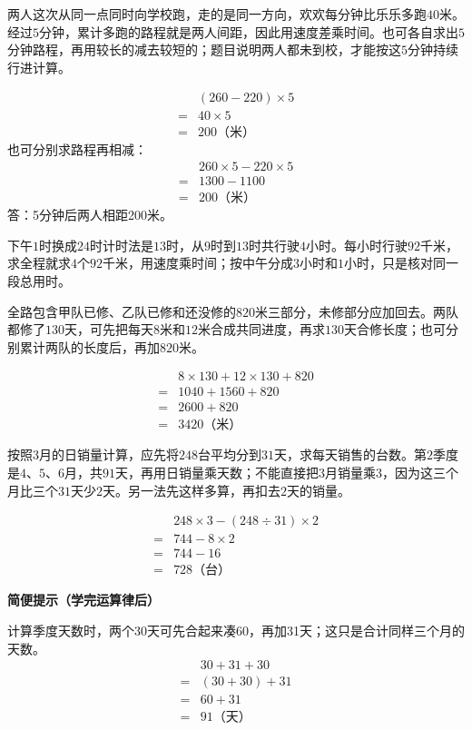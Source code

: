 \documentclass[multi=snippet,border=0pt]{standalone}
\newenvironment{snippet}[3]{\begin{minipage}{#1bp}\color{answerred}\fontsize{#2}{#3}\selectfont\raggedright}{\end{minipage}}
\begin{document}
\begin{snippet}{505}{11.5}{14}两人这次从同一点同时向学校跑，走的是同一方向，欢欢每分钟比乐乐多跑\(40\)米。经过\(5\)分钟，累计多跑的路程就是两人间距，因此用速度差乘时间。也可各自求出\(5\)分钟路程，再用较长的减去较短的；题目说明两人都未到校，才能按这\(5\)分钟持续行进计算。\par \[\begin{aligned}&(260-220)\times5\\={}&40\times5\\={}&200\text{（米）}\end{aligned}\]也可分别求路程再相减：\[\begin{aligned}&260\times5-220\times5\\={}&1300-1100\\={}&200\text{（米）}\end{aligned}\]答：5分钟后两人相距200米。\end{snippet}
\begin{snippet}{505}{11.5}{14}下午\(1\)时换成\(24\)时计时法是\(13\)时，从\(9\)时到\(13\)时共行驶\(4\)小时。每小时行驶\(92\)千米，求全程就求\(4\)个\(92\)千米，用速度乘时间；按中午分成\(3\)小时和\(1\)小时，只是核对同一段总用时。\end{snippet}
\begin{snippet}{505}{11.5}{14}全路包含甲队已修、乙队已修和还没修的\(820\)米三部分，未修部分应加回去。两队都修了\(130\)天，可先把每天\(8\)米和\(12\)米合成共同进度，再求\(130\)天合修长度；也可分别累计两队的长度后，再加\(820\)米。\par \[\begin{aligned}&8\times130+12\times130+820\\={}&1040+1560+820\\={}&2600+820\\={}&3420\text{（米）}\end{aligned}\]\end{snippet}
\begin{snippet}{505}{11.5}{14}按照\(3\)月的日销量计算，应先将\(248\)台平均分到\(31\)天，求每天销售的台数。第\(2\)季度是\(4\)、\(5\)、\(6\)月，共\(91\)天，再用日销量乘天数；不能直接把\(3\)月销量乘\(3\)，因为这三个月比三个\(31\)天少\(2\)天。另一法先这样多算，再扣去\(2\)天的销量。\par \[\begin{aligned}&248\times3-(248\div31)\times2\\={}&744-8\times2\\={}&744-16\\={}&728\text{（台）}\end{aligned}\]\par\textbf{简便提示（学完运算律后）}\par 计算季度天数时，两个30天可先合起来凑60，再加31天；这只是合计同样三个月的天数。\[\begin{aligned}&30+31+30\\={}&(30+30)+31\\={}&60+31\\={}&91\text{（天）}\end{aligned}\]\end{snippet}
\end{document}
